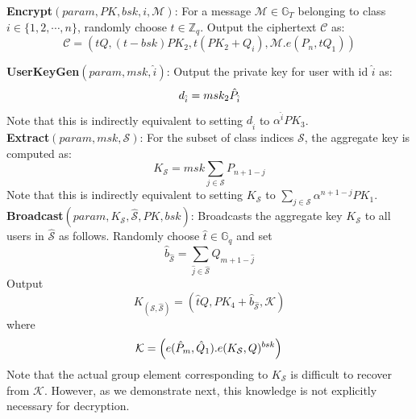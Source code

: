  \noindent \textbf{Encrypt}$(param,PK,bsk,i,\mathcal{M})$: For a message $\mathcal{M} \in \mathbb{G}_T$ belonging to class $i \in \{1,2,\cdots,n\}$, randomly choose $t\in\mathbb{Z}_q$. Output the ciphertext $\mathcal{C}$ as:
 \begin{equation}
 \mathcal{C}=(tQ,(t-bsk)PK_2,t(PK_2+Q_i),\mathcal{M}.{e}(P_n,tQ_1)) \nonumber
 \end{equation}
 
 \noindent \textbf{UserKeyGen}$(param,msk,\hat{i})$: Output the private key for user with id $\hat{i}$ as: 
 \begin{equation}
  d_{\hat{i}} = msk_2{\hat{P}}_{\hat{i}} \nonumber\\
 \end{equation}
 \noindent Note that this is indirectly equivalent to setting $d_{\hat{i}}$ to $\alpha^{\hat{i}}PK_3$.\\
 
 \noindent \textbf{Extract}$(param,msk,\mathcal{S})$: For the subset of class indices $\mathcal{S}$, the aggregate key is computed as: 
 \begin{equation}
 K_{\mathcal{S}} = {msk}\sum_{j\in\mathcal{S}}P_{n+1-j} \nonumber
 \end{equation} 
 \noindent Note that this is indirectly equivalent to setting $K_{\mathcal{S}}$ to $\sum_{j\in\mathcal{S}}\alpha^{n+1-j}PK_1$.\\
 
 \noindent \textbf{Broadcast}$(param,K_{\mathcal{S}},\hat{\mathcal{S}},PK,bsk)$:  Broadcasts the aggregate key $K_{\mathcal{S}}$ to all users in $\hat{\mathcal{S}}$ as follows. Randomly choose $\hat{t}\in\mathbb{G}_q$ and set
 \begin{equation}
  \hat{b}_{\hat{\mathcal{S}}}=\sum_{\hat{j}\in\hat{\mathcal{S}}}\hat{Q}_{m+1-\hat{j}} \nonumber 
 \end{equation}
 \noindent Output
 \begin{equation}
  K_{\left(\mathcal{S},\hat{\mathcal{S}}\right)} = (\hat{t}Q,PK_4+\hat{b}_{\hat{\mathcal{S}}},\mathcal{K})\nonumber
 \end{equation}
 \noindent where 
 \begin{equation}
  \mathcal{K}=\left(e(\hat{P}_m,\hat{Q}_1).e(K_{\mathcal{S}},Q)^{bsk}\right)\nonumber\\
 \end{equation}
 \noindent Note that the actual group element corresponding to $K_{\mathcal{S}}$ is difficult to recover from $\mathcal{K}$. However, as we demonstrate next, this knowledge is not explicitly necessary for decryption.\\
 
